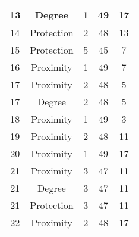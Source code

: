 \documentclass[results.tex]{subfiles}
\begin{document}
\begin{center}
\begin{tabular}{| c || c | c | c | c |}
            \hline
            13                      & Degree                       & 1                      & 49                      & 17                   \\
            \hline
            14                      & Protection                   & 2                      & 48                      & 13                   \\
            \hline
            15                      & Protection                   & 5                      & 45                      & 7                    \\
            \hline
            16                      & Proximity                    & 1                      & 49                      & 7                    \\
            \hline
            17                      & Proximity                    & 2                      & 48                      & 5                    \\
            \hline
            17                      & Degree                       & 2                      & 48                      & 5                    \\
            \hline
            18                      & Proximity                    & 1                      & 49                      & 3                    \\
            \hline
            19                      & Proximity                    & 2                      & 48                      & 11                   \\
            \hline
            20                      & Proximity                    & 1                      & 49                      & 17                   \\
            \hline
            21                      & Proximity                    & 3                      & 47                      & 11                   \\
            \hline
            21                      & Degree                       & 3                      & 47                      & 11                   \\
            \hline
            21                      & Protection                   & 3                      & 47                      & 11                   \\
            \hline
            22                      & Proximity                    & 2                      & 48                      & 17                   \\

\end{tabular}
\end{center}
\end{document}
